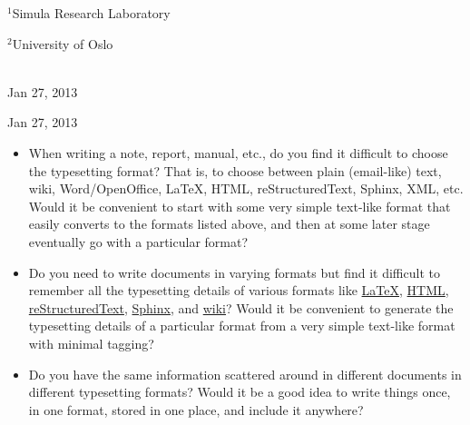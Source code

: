 \documentclass[%
oneside,                 %
final,                   %
chapterprefix=true,      %
open=right               %
10pt]{book}
\begin{document}
\begin{center}
\begin{center}
\centerline{{\small ${}^1$Simula Research Laboratory}}
\centerline{{\small ${}^2$University of Oslo}}
\end{center}





\date{Jan 27, 2013}
\maketitle


\ \\ [10mm]
{\large\textsf{Jan 27, 2013}}

\end{center}
\vfill
\clearpage


\begin{center}
Jan 27, 2013
\end{center}

\vspace{1cm}



\begin{itemize}
 \item When writing a note, report, manual, etc., do you find it difficult
   to choose the typesetting format? That is, to choose between plain
   (email-like) text, wiki, Word/OpenOffice, {\LaTeX}, HTML,
   reStructuredText, Sphinx, XML, etc.  Would it be convenient to
   start with some very simple text-like format that easily converts
   to the formats listed above, and then at some later stage
   eventually go with a particular format?

 \item Do you need to write documents in varying formats but find it
   difficult to remember all the typesetting details of various
   formats like \href{{http://refcards.com/docs/silvermanj/amslatex/LaTeXRefCard.v2.0.pdf}}{LaTeX}, \href{{http://www.htmlcodetutorial.com/}}{HTML}, \href{{http://docutils.sourceforge.net/docs/ref/rst/restructuredtext.html}}{reStructuredText}, \href{{http://sphinx.pocoo.org/contents.html}}{Sphinx}, and \href{{http://code.google.com/p/support/wiki/WikiSyntax}}{wiki}? Would it be convenient
   to generate the typesetting details of a particular format from a
   very simple text-like format with minimal tagging?

 \item Do you have the same information scattered around in different
   documents in different typesetting formats? Would it be a good idea
   to write things once, in one format, stored in one place, and
   include it anywhere?
\end{itemize}
\end{document}
